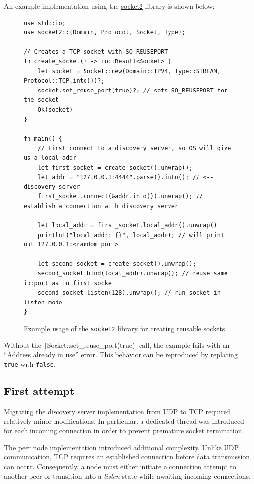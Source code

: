\documentclass[a4paper, 10pt]{article}
\begin{document}
An example implementation using the \href{https://crates.io/crates/socket2}{socket2} library is shown below:

\begin{figure}[H]
  \begin{verbatim}
use std::io;
use socket2::{Domain, Protocol, Socket, Type};

// Creates a TCP socket with SO_REUSEPORT
fn create_socket() -> io::Result<Socket> {
    let socket = Socket::new(Domain::IPV4, Type::STREAM, Protocol::TCP.into())?;
    socket.set_reuse_port(true)?; // sets SO_REUSEPORT for the socket
    Ok(socket)
}

fn main() {
    // First connect to a discovery server, so OS will give us a local addr
    let first_socket = create_socket().unwrap();
    let addr = "127.0.0.1:4444".parse().into(); // <-- discovery server
    first_socket.connect(&addr.into()).unwrap(); // establish a connection with discovery server

    let local_addr = first_socket.local_addr().unwrap()
    println!("local addr: {}", local_addr); // will print out 127.0.0.1:<random port>

    let second_socket = create_socket().unwrap();
    second_socket.bind(local_addr).unwrap(); // reuse same ip:port as in first socket
    second_socket.listen(128).unwrap(); // run socket in listen mode
}
  \end{verbatim}
  \caption{Example usage of the \texttt{socket2} library for creating reusable sockets}
\end{figure}

Without the \texttt|Socket::set_reuse_port(true)| call, the example fails with an ``Address already in use'' error.
This behavior can be reproduced by replacing \texttt{true} with \texttt{false}.

\subsection{First attempt}

Migrating the discovery server implementation from UDP to TCP required relatively minor modifications.
In particular, a dedicated thread was introduced for each incoming connection in order to prevent premature socket termination.

The peer node implementation introduced additional complexity.
Unlike UDP communication, TCP requires an established connection before data transmission can occur.
Consequently, a node must either initiate a connection attempt to another peer or transition into a \emph{listen} state while awaiting incoming connections.
\end{document}
